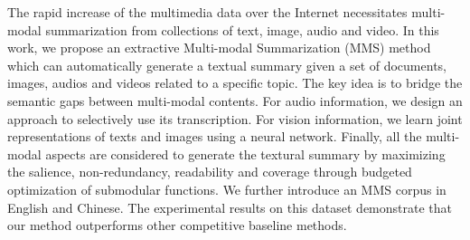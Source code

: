 The rapid increase of the multimedia data over the Internet necessitates multi-modal summarization from collections of text, image, audio and video. In this work, we propose an extractive Multi-modal Summarization (MMS) method which can automatically generate a textual summary given a set of documents, images, audios and videos related to a specific topic. The key idea is to bridge the semantic gaps between multi-modal contents. For audio information, we design an approach to selectively use its transcription. For vision information, we learn joint representations of texts and images using a neural network. Finally, all the multi-modal aspects are considered to generate the textural summary by maximizing the salience, non-redundancy, readability and coverage through budgeted optimization of submodular functions.  We further introduce an MMS corpus in English and Chinese. The experimental results on this dataset demonstrate that our method outperforms other competitive baseline methods.
